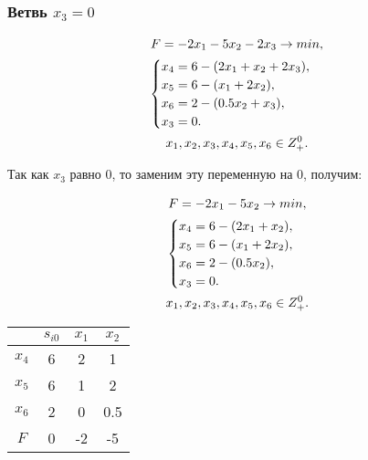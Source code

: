 \documentclass[12pt,a4paper,oneside]{extarticle}
\begin{document}
        \subsubsection{Ветвь $x_3 = 0$}
            \begin{gather}
                F = -2x_1-5x_2-2x_3 \rightarrow min,  \notag  \\
                \begin{cases}
                    x_4 = 6 - (2x_1 + x_2 + 2x_3), \\
                    x_5 = 6 - (x_1 + 2x_2),\\
                    x_6 = 2 - (0.5x_2 + x_3), \\
                    x_3 = 0.
                \end{cases} 
                \notag \\
                x_1, x_2, x_3, x_4, x_5, x_6 \in Z^0_+. \notag
            \end{gather}

            Так как $x_3$ равно 0, то заменим эту переменную на 0, получим:

            \begin{gather}
                F = -2x_1-5x_2 \rightarrow min,  \notag  \\
                \begin{cases}
                    x_4 = 6 - (2x_1 + x_2), \\
                    x_5 = 6 - (x_1 + 2x_2),\\
                    x_6 = 2 - (0.5x_2), \\
                    x_3 = 0.
                \end{cases} 
                \notag \\
                x_1, x_2, x_3, x_4, x_5, x_6 \in Z^0_+. \notag
            \end{gather}

            \begin{center}
            \begin{tabular}{|c|c|c|c|}
                \hline
                     & $s_{i0}$ & $x_1$ & $x_2$  \\ \hline
                $x_4$ & 6       & 2     & 1      \\ \hline
                $x_5$ & 6       & 1     & 2     \\ \hline
                $x_6$ & 2       & 0     & 0.5    \\ \hline
                $F$   & 0       & -2    & -5     \\ \hline
            \end{tabular}
            \end{center}    
\end{document}
